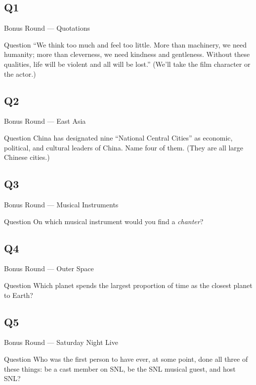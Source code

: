 \documentclass[11pt]{beamer}
\begin{document}
\subsection*{Q1}
\begin{frame}[t]{Bonus Round --- Quotations}
\vspace{-0.5em}
\begin{block}{Question}
``We think too much and feel too little. More than machinery, we need humanity; more than cleverness, we need kindness and gentleness. Without these qualities, life will be violent and all will be lost.'' (We'll take the film character or the actor.)
\end{block}
\end{frame}
\subsection*{Q2}
\begin{frame}[t]{Bonus Round --- East Asia}
\vspace{-0.5em}
\begin{block}{Question}
China has designated nine ``National Central Cities'' as economic, political, and cultural leaders of China. Name four of them. (They are all large Chinese cities.)
\end{block}
\end{frame}
\subsection*{Q3}
\begin{frame}[t]{Bonus Round --- Musical Instruments}
\vspace{-0.5em}
\begin{block}{Question}
On which musical instrument would you find a \emph{chanter}?
\end{block}
\end{frame}
\subsection*{Q4}
\begin{frame}[t]{Bonus Round --- Outer Space}
\vspace{-0.5em}
\begin{block}{Question}
Which planet spends the largest proportion of time as the closest planet to Earth?
\end{block}
\end{frame}
\subsection*{Q5}
\begin{frame}[t]{Bonus Round --- Saturday Night Live}
\vspace{-0.5em}
\begin{block}{Question}
Who was the first person to have ever, at some point, done all three of these things: be a cast member on SNL, be the SNL musical guest, and host SNL\@?
\end{block}
\end{frame}
\end{document}

